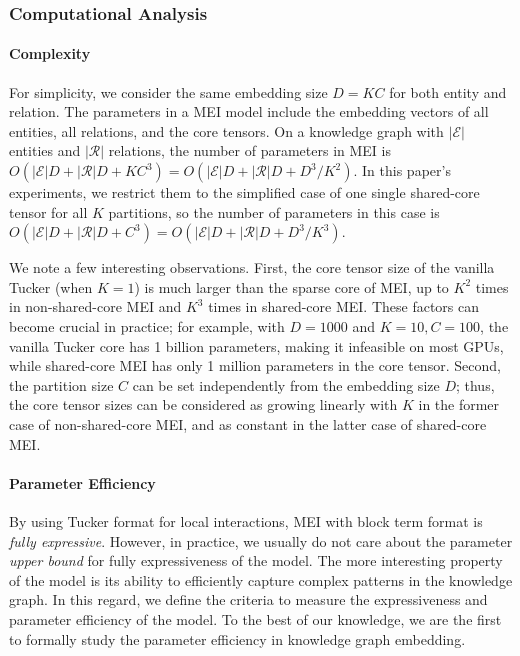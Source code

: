 \documentclass{ecai}
\def\gE{{\mathcal{E}}}
\def\gR{{\mathcal{R}}}
\theoremstyle{plain}  \newtheorem{thm}{Theorem}  \newtheorem{lem}[thm]{Lemma}  \newtheorem{prop}[thm]{Proposition}
\theoremstyle{remark}  \newtheorem*{rem}{Remark}
\begin{document}
\subsubsection{Computational Analysis} \paragraph{Complexity} For simplicity, we consider the same embedding size $ D = KC $ for both entity and relation. The parameters in a MEI model include the embedding vectors of all entities, all relations, and the core tensors. On a knowledge graph with $ |\gE| $ entities and $ |\gR| $ relations, the number of parameters in MEI is $ O(|\gE| D + |\gR| D + K C^3) = O(|\gE| D + |\gR| D + D^3 / K^2) $. In this paper's experiments, we restrict them to the simplified case of one single shared-core tensor for all $ K $ partitions, so the number of parameters in this case is $ O(|\gE| D + |\gR| D + C^3) = O(|\gE| D + |\gR| D + D^3 / K^3) $.

We note a few interesting observations. First, the core tensor size of the vanilla Tucker (when $ K = 1 $) is much larger than the sparse core of MEI, up to $ K^2 $ times in non-shared-core MEI and $ K^3 $ times in shared-core MEI. These factors can become crucial in practice; for example, with $ D = 1000$ and $K = 10, C = 100 $, the vanilla Tucker core has 1 billion parameters, making it infeasible on most GPUs, while shared-core MEI has only 1 million parameters in the core tensor. Second, the partition size $ C $ can be set independently from the embedding size $ D $; thus, the core tensor sizes can be considered as growing linearly with $ K $ in the former case of non-shared-core MEI, and as constant in the latter case of shared-core MEI.

\paragraph{Parameter Efficiency} By using Tucker format for local interactions, MEI with block term format is \textit{fully expressive}. However, in practice, we usually do not care about the parameter \textit{upper bound} for fully expressiveness of the model. The more interesting property of the model is its ability to efficiently capture complex patterns in the knowledge graph. In this regard, we define the criteria to measure the expressiveness and parameter efficiency of the model. To the best of our knowledge, we are the first to formally study the parameter efficiency in knowledge graph embedding.
\end{document}
